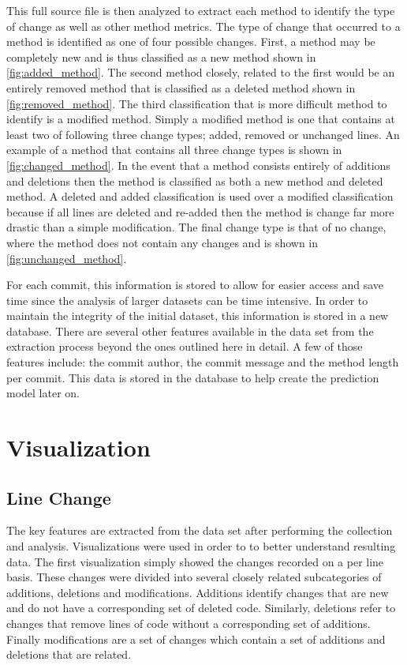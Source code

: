 This full source file is then analyzed to extract each method to identify the type of change as well as other method metrics. The type of change that occurred to a method is identified as one of four possible changes. First, a method may be completely new and is thus classified as a new method shown in \autoref{fig:added_method}. The second method closely, related to the first would be an entirely removed method that is classified as a deleted method shown in \autoref{fig:removed_method}. The third classification that is more difficult method to identify is a modified method. Simply a modified method is one that contains at least two of following three change types; added, removed or unchanged lines. An example of a method that contains all three change types is shown in \autoref{fig:changed_method}. In the event that a method consists entirely of additions and deletions then the method is classified as both a new method and deleted method. A deleted and added classification is used over a modified classification because if all lines are deleted and re-added then the method is change far more drastic than a simple modification. The final change type is that of no change, where the method does not contain any changes and is shown in \autoref{fig:unchanged_method}.

For each commit, this information is stored to allow for easier access and save time since the analysis of larger datasets can be time intensive. In order to maintain the integrity of the initial dataset, this information is stored in a new database. There are several other features available in the data set from the extraction process beyond the ones outlined here in detail. A few of those features include: the commit author, the commit message and the method length per commit. This data is stored in the database to help create the prediction model later on.

\section{Visualization}

\subsection{Line Change}
\label{subsec:line_change}

The key features are extracted from the data set after performing the collection and analysis. Visualizations were used in order to to better understand resulting data. The first visualization simply showed the changes recorded on a per line basis. These changes were divided into several closely related subcategories of additions, deletions and modifications. Additions identify changes that are new and do not have a corresponding set of deleted code. Similarly, deletions refer to changes that remove lines of code without a corresponding set of additions. Finally modifications are a set of changes which contain a set of additions and deletions that are related.

